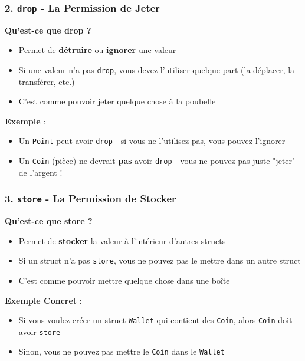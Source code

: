 \documentclass[11pt]{article}
\begin{document}
\subsubsection{2. \texttt{drop} - La Permission de Jeter}

\begin{explainBox}
\textbf{Qu'est-ce que drop ?}
\begin{itemize}
  \item Permet de \textbf{détruire} ou \textbf{ignorer} une valeur
  \item Si une valeur n'a pas \texttt{drop}, vous devez l'utiliser quelque part (la déplacer, la transférer, etc.)
  \item C'est comme pouvoir jeter quelque chose à la poubelle
\end{itemize}
\end{explainBox}

\begin{exampleBox}
\textbf{Exemple} :
\begin{itemize}
  \item Un \texttt{Point} peut avoir \texttt{drop} - si vous ne l'utilisez pas, vous pouvez l'ignorer
  \item Un \texttt{Coin} (pièce) ne devrait \textbf{pas} avoir \texttt{drop} - vous ne pouvez pas juste "jeter" de l'argent !
\end{itemize}
\end{exampleBox}

\subsubsection{3. \texttt{store} - La Permission de Stocker}

\begin{explainBox}
\textbf{Qu'est-ce que store ?}
\begin{itemize}
  \item Permet de \textbf{stocker} la valeur à l'intérieur d'autres structs
  \item Si un struct n'a pas \texttt{store}, vous ne pouvez pas le mettre dans un autre struct
  \item C'est comme pouvoir mettre quelque chose dans une boîte
\end{itemize}
\end{explainBox}

\begin{noteBox}
\textbf{Exemple Concret} :
\begin{itemize}
  \item Si vous voulez créer un struct \texttt{Wallet} qui contient des \texttt{Coin}, alors \texttt{Coin} doit avoir \texttt{store}
  \item Sinon, vous ne pouvez pas mettre le \texttt{Coin} dans le \texttt{Wallet}
\end{itemize}
\end{noteBox}
\end{document}
